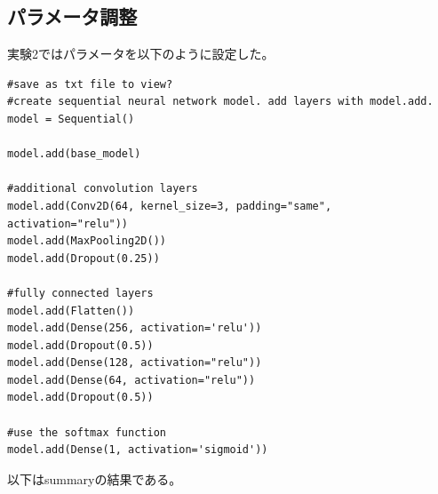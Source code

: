 \documentclass[a4paper, 11pt, titlepage]{jsarticle}
\begin{document}
\subsection{パラメータ調整}
実験2ではパラメータを以下のように設定した。\par
\begin{lstlisting}[caption=パラメータ(実験2),label=fuga]
#save as txt file to view?
#create sequential neural network model. add layers with model.add.
model = Sequential()

model.add(base_model)

#additional convolution layers
model.add(Conv2D(64, kernel_size=3, padding="same", activation="relu"))
model.add(MaxPooling2D())
model.add(Dropout(0.25))

#fully connected layers
model.add(Flatten())
model.add(Dense(256, activation='relu'))
model.add(Dropout(0.5))
model.add(Dense(128, activation="relu")) 
model.add(Dense(64, activation="relu")) 
model.add(Dropout(0.5))

#use the softmax function
model.add(Dense(1, activation='sigmoid'))

\end{lstlisting}\par
以下はsummaryの結果である。\par
　\par
\end{document}
